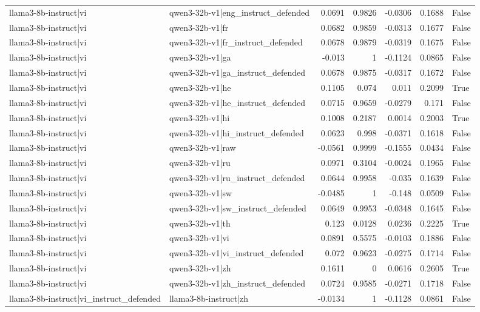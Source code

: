 \begin{table}
\begin{tabular}{l l r r r r l}
llama3-8b-instruct|vi & qwen3-32b-v1|eng_instruct_defended & 0.0691 & 0.9826 & -0.0306 & 0.1688 & False \\
llama3-8b-instruct|vi & qwen3-32b-v1|fr & 0.0682 & 0.9859 & -0.0313 & 0.1677 & False \\
llama3-8b-instruct|vi & qwen3-32b-v1|fr_instruct_defended & 0.0678 & 0.9879 & -0.0319 & 0.1675 & False \\
llama3-8b-instruct|vi & qwen3-32b-v1|ga & -0.013 & 1 & -0.1124 & 0.0865 & False \\
llama3-8b-instruct|vi & qwen3-32b-v1|ga_instruct_defended & 0.0678 & 0.9875 & -0.0317 & 0.1672 & False \\
llama3-8b-instruct|vi & qwen3-32b-v1|he & 0.1105 & 0.074 & 0.011 & 0.2099 & True \\
llama3-8b-instruct|vi & qwen3-32b-v1|he_instruct_defended & 0.0715 & 0.9659 & -0.0279 & 0.171 & False \\
llama3-8b-instruct|vi & qwen3-32b-v1|hi & 0.1008 & 0.2187 & 0.0014 & 0.2003 & True \\
llama3-8b-instruct|vi & qwen3-32b-v1|hi_instruct_defended & 0.0623 & 0.998 & -0.0371 & 0.1618 & False \\
llama3-8b-instruct|vi & qwen3-32b-v1|raw & -0.0561 & 0.9999 & -0.1555 & 0.0434 & False \\
llama3-8b-instruct|vi & qwen3-32b-v1|ru & 0.0971 & 0.3104 & -0.0024 & 0.1965 & False \\
llama3-8b-instruct|vi & qwen3-32b-v1|ru_instruct_defended & 0.0644 & 0.9958 & -0.035 & 0.1639 & False \\
llama3-8b-instruct|vi & qwen3-32b-v1|sw & -0.0485 & 1 & -0.148 & 0.0509 & False \\
llama3-8b-instruct|vi & qwen3-32b-v1|sw_instruct_defended & 0.0649 & 0.9953 & -0.0348 & 0.1645 & False \\
llama3-8b-instruct|vi & qwen3-32b-v1|th & 0.123 & 0.0128 & 0.0236 & 0.2225 & True \\
llama3-8b-instruct|vi & qwen3-32b-v1|vi & 0.0891 & 0.5575 & -0.0103 & 0.1886 & False \\
llama3-8b-instruct|vi & qwen3-32b-v1|vi_instruct_defended & 0.072 & 0.9623 & -0.0275 & 0.1714 & False \\
llama3-8b-instruct|vi & qwen3-32b-v1|zh & 0.1611 & 0 & 0.0616 & 0.2605 & True \\
llama3-8b-instruct|vi & qwen3-32b-v1|zh_instruct_defended & 0.0724 & 0.9585 & -0.0271 & 0.1718 & False \\
llama3-8b-instruct|vi_instruct_defended & llama3-8b-instruct|zh & -0.0134 & 1 & -0.1128 & 0.0861 & False \\

\end{tabular}
\end{table}
